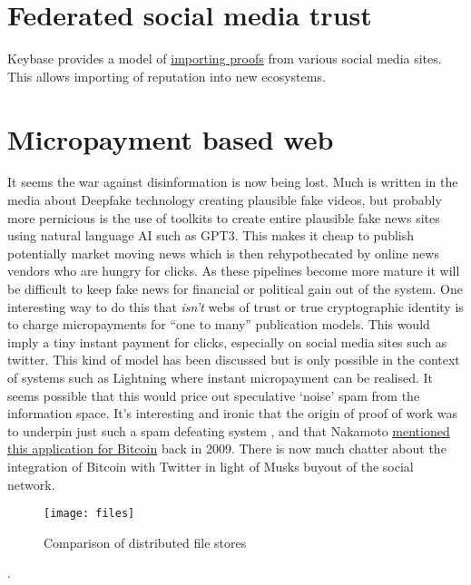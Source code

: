 \section{Federated social media trust}
Keybase provides a model of \href{https://book.keybase.io/account#proofs}{importing proofs} from various social media sites. This allows importing of reputation into new ecosystems.
\section{Micropayment based web}
It seems the war against disinformation is now being lost. Much is written in the media about Deepfake technology creating plausible fake videos, but probably more pernicious is the use of toolkits to create entire plausible fake news sites using natural language AI such as GPT3. This makes it cheap to publish potentially market moving news which is then rehypothecated by online news vendors who are hungry for clicks. As these pipelines become more mature it will be difficult to keep fake news for financial or political gain out of the system. One interesting way to do this that \textit{isn't} webs of trust or true cryptographic identity is to charge micropayments for ``one to many'' publication models. This would imply a tiny instant payment for clicks, especially on social media sites such as twitter. This kind of model has been discussed but is only possible in the context of systems such as Lightning where instant micropayment can be realised. It seems possible that this would price out speculative `noise' spam from the information space. It's interesting and ironic that the origin of proof of work was to underpin just such a spam defeating system  \cite{dwork1992pricing}, and that Nakamoto \href{https://www.metzdowd.com/pipermail/cryptography/2009-January/015014.html}{mentioned this application for Bitcoin} back in 2009. There is now much chatter about the integration of Bitcoin with Twitter in light of Musks buyout of the social network.
\begin{figure}
\texttt{[image: files]}
  \caption{Comparison of distributed file stores}
  \label{fig:Files}
\end{figure}. 

